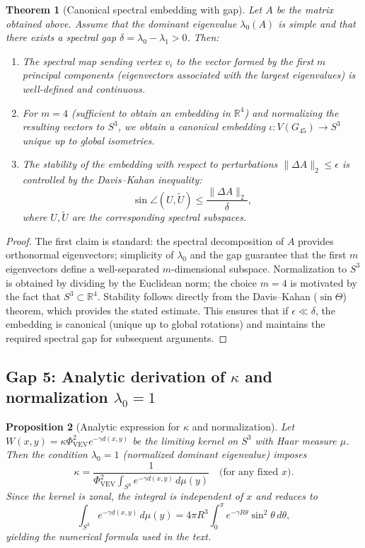 \documentclass[12pt]{article}
\newtheorem{theorem}{Theorem}[section]
\newtheorem{proposition}[theorem]{Proposition}
\numberwithin{equation}{section}
\newcommand{\VEV}{\Phi_{\mathrm{VEV}}}
\begin{document}
\begin{theorem}[Canonical spectral embedding with gap]
\label{thm:embedding_gap_final}
Let \(A\) be the matrix obtained above. Assume that the dominant eigenvalue \(\lambda_0(A)\) is simple and that there exists a spectral gap \(\delta=\lambda_0-\lambda_1>0\). Then:
\begin{enumerate}
  \item The spectral map sending vertex \(v_i\) to the vector formed by the first \(m\) principal components (eigenvectors associated with the largest eigenvalues) is well-defined and continuous.
  \item For \(m=4\) (sufficient to obtain an embedding in \(\mathbb{R}^4\)) and normalizing the resulting vectors to \(S^3\), we obtain a canonical embedding \(\iota:V(G_{45})\to S^3\) unique up to global isometries.
  \item The stability of the embedding with respect to perturbations \(\|\Delta A\|_2\le\epsilon\) is controlled by the Davis–Kahan inequality:
    \[
    \sin\angle(U,\widetilde{U}) \le \frac{\|\Delta A\|_2}{\delta},
    \]
    where \(U,\widetilde{U}\) are the corresponding spectral subspaces.
\end{enumerate}
\end{theorem}

\begin{proof}
The first claim is standard: the spectral decomposition of \(A\) provides orthonormal eigenvectors; simplicity of \(\lambda_0\) and the gap guarantee that the first \(m\) eigenvectors define a well-separated \(m\)-dimensional subspace. Normalization to \(S^3\) is obtained by dividing by the Euclidean norm; the choice \(m=4\) is motivated by the fact that \(S^3\subset\mathbb{R}^4\). Stability follows directly from the Davis–Kahan (\(\sin\Theta\)) theorem, which provides the stated estimate. This ensures that if \(\epsilon\ll\delta\), the embedding is canonical (unique up to global rotations) and maintains the required spectral gap for subsequent arguments.
\end{proof}

\subsection{Gap 5: Analytic derivation of \(\kappa\) and normalization \(\lambda_0=1\)}

\begin{proposition}[Analytic expression for \(\kappa\) and normalization]
\label{prop:kappa_lambda0_final}
Let \(W(x,y)=\kappa\VEV^2 e^{-\gamma d(x,y)}\) be the limiting kernel on \(S^3\) with Haar measure \(\mu\). Then the condition \(\lambda_0=1\) (normalized dominant eigenvalue) imposes
\begin{equation}\label{eq:kappa_formula_final}
\kappa = \frac{1}{\VEV^2 \displaystyle\int_{S^3} e^{-\gamma d(x,y)}\,d\mu(y)}\quad\text{(for any fixed }x\text{)}.
\end{equation}
Since the kernel is zonal, the integral is independent of \(x\) and reduces to
\[
\int_{S^3} e^{-\gamma d(x,y)}\,d\mu(y) = 4\pi R^3 \int_0^\pi e^{-\gamma R\theta}\sin^2\theta\,d\theta,
\]
yielding the numerical formula used in the text.
\end{proposition}
\end{document}
